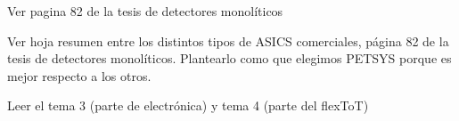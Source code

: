 Ver pagina 82 de la tesis de detectores monolíticos

Ver hoja resumen entre los distintos tipos de ASICS comerciales, página 82 de la tesis de detectores monolíticos. Plantearlo como que elegimos PETSYS porque es mejor respecto a los otros.

Leer el tema 3 (parte de electrónica) y tema 4 (parte del flexToT)